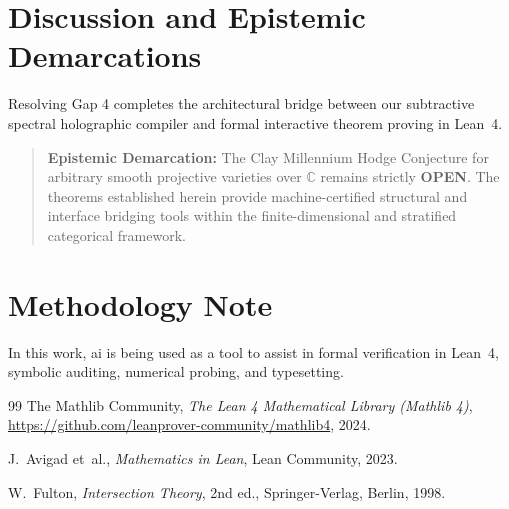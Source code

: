 \documentclass[11pt,a4paper]{article}
\theoremstyle{definition}
\begin{document}
\section{Discussion and Epistemic Demarcations}

Resolving Gap 4 completes the architectural bridge between our subtractive spectral holographic compiler and formal interactive theorem proving in Lean~4.

\begin{quote}
\textbf{Epistemic Demarcation:} The Clay Millennium Hodge Conjecture for arbitrary smooth projective varieties over $\mathbb{C}$ remains strictly \textbf{OPEN}. The theorems established herein provide machine-certified structural and interface bridging tools within the finite-dimensional and stratified categorical framework.
\end{quote}

\section*{Methodology Note}
In this work, ai is being used as a tool to assist in formal verification in Lean~4, symbolic auditing, numerical probing, and typesetting.

\begin{thebibliography}{99}
The Mathlib Community,
\emph{The Lean 4 Mathematical Library (Mathlib 4)},
\url{https://github.com/leanprover-community/mathlib4}, 2024.

J.~Avigad et~al.,
\emph{Mathematics in Lean},
Lean Community, 2023.

W.~Fulton,
\emph{Intersection Theory},
2nd ed., Springer-Verlag, Berlin, 1998.
\end{thebibliography}
\end{document}
